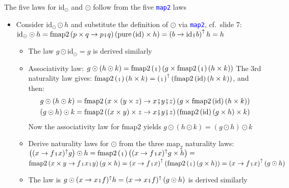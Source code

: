 \vspace{-0.10cm}The five laws for $\text{id}_{\odot}$ and $\odot$
follow from the five \texttt{\textcolor{blue}{\footnotesize{}map2}}
laws
\begin{itemize}
\item Consider $\text{id}_{\odot}\odot h$ and substitute the definition
of $\odot$ via \texttt{\textcolor{blue}{\footnotesize{}map2}}, cf.\ slide
7: $\text{id}_{\odot}\odot h=\text{fmap2}\left(p\times q\rightarrow p\bef q\right)\left(\text{pure}\left(\text{id}\right)\times h\right)=\left(b\rightarrow\text{id}\bef b\right)^{\uparrow}h=h$
\begin{itemize}
\item The law $g\odot\text{id}_{\odot}=g$ is derived similarly
\item Associativity law: {\footnotesize{}$g\odot\left(h\odot k\right)=\text{fmap2}\left(\bef\right)\left(g\times\text{fmap2}\left(\bef\right)\left(h\times k\right)\right)$}
The 3rd naturality law gives:{\footnotesize{} $\text{fmap2}\left(\bef\right)\left(h\times k\right)=\left(\bef\right)^{\uparrow}\left(\text{fmap2}\left(\text{id}\right)\left(h\times k\right)\right)$},
and then:{\footnotesize{}
\begin{align*}
g\odot\left(h\odot k\right) & =\text{fmap2}\left(x\times\left(y\times z\right)\rightarrow x\bef y\bef z\right)\left(g\times\text{fmap2}\left(\text{id}\right)\left(h\times k\right)\right)\\
\left(g\odot h\right)\odot k & =\text{fmap2}\left(\left(x\times y\right)\times z\rightarrow x\bef y\bef z\right)\left(\text{fmap2}\left(\text{id}\right)\left(g\times h\right)\times k\right)
\end{align*}
}Now the associativity law for{\footnotesize{} $\text{fmap2}$ }yields
{\footnotesize{}$g\odot\left(h\odot k\right)=\left(g\odot h\right)\odot k$}{\footnotesize\par}
\item Derive naturality laws for $\odot$ from the three {\footnotesize{}$\text{map}_{2}$}
naturality laws: {\footnotesize{}$\left((x\rightarrow f\bef x)^{\uparrow}g\right)\odot h=\text{fmap2}\left(\bef\right)\left((x\rightarrow f\bef x)^{\uparrow}g\times h\right)=$
$\text{fmap2}\left(x\times y\rightarrow f\bef x\bef y\right)\left(g\times h\right)=\left(x\rightarrow f\bef x\right)^{\uparrow}\left(\text{fmap2}\left(\bef\right)\left(g\times h\right)\right)=\left(x\rightarrow f\bef x\right)^{\uparrow}\left(g\odot h\right)$}{\footnotesize\par}
\item The law is {\footnotesize{}$g\odot(x\rightarrow x\bef f)^{\uparrow}h=(x\rightarrow x\bef f)^{\uparrow}\left(g\odot h\right)$}
is derived similarly
\end{itemize}
\end{itemize}



